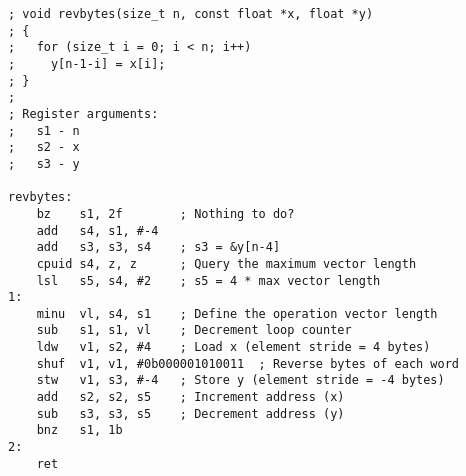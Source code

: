 \begin{lstlisting}[style=assembler]
; void revbytes(size_t n, const float *x, float *y)
; {
;   for (size_t i = 0; i < n; i++)
;     y[n-1-i] = x[i];
; }
;
; Register arguments:
;   s1 - n
;   s2 - x
;   s3 - y

revbytes:
    bz    s1, 2f        ; Nothing to do?
    add   s4, s1, #-4
    add   s3, s3, s4    ; s3 = &y[n-4]
    cpuid s4, z, z      ; Query the maximum vector length
    lsl   s5, s4, #2    ; s5 = 4 * max vector length
1:
    minu  vl, s4, s1    ; Define the operation vector length
    sub   s1, s1, vl    ; Decrement loop counter
    ldw   v1, s2, #4    ; Load x (element stride = 4 bytes)
    shuf  v1, v1, #0b000001010011  ; Reverse bytes of each word
    stw   v1, s3, #-4   ; Store y (element stride = -4 bytes)
    add   s2, s2, s5    ; Increment address (x)
    sub   s3, s3, s5    ; Decrement address (y)
    bnz   s1, 1b
2:
    ret
\end{lstlisting}

\twocolumn
